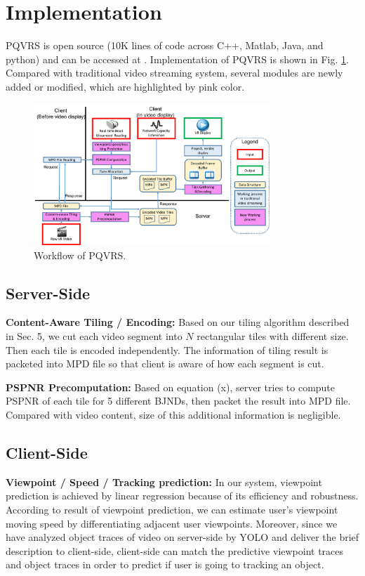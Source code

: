 \section{Implementation}

PQVRS is open source (10K lines of code across C++, Matlab, Java, and python) and can be accessed at \cite{github}. Implementation of PQVRS is shown in Fig. \ref{implementation}. Compared with traditional video streaming system, several modules are newly added or modified, which are highlighted by pink color.

\begin{figure}
  \centering
  \includegraphics[width=3.5in]{images/implementation.pdf}
  \caption{Workflow of PQVRS.}
  \label{implementation}
  \end{figure}

\subsection{Server-Side}

\textbf{Content-Aware Tiling / Encoding:} Based on our tiling algorithm described in Sec. 5, we cut each video segment into $N$ rectangular tiles with different size. Then each tile is encoded independently. The information of tiling result is packeted into MPD file so that client is aware of how each segment is cut. 

\textbf{PSPNR Precomputation:} Based on equation (x), server tries to compute PSPNR of each tile for 5 different BJNDs, then packet the result into MPD file. Compared with video content, size of this additional information is negligible.

\subsection{Client-Side}

\textbf{Viewpoint / Speed / Tracking prediction:} In our system, viewpoint prediction is achieved by linear regression because of its efficiency and robustness. According to result of viewpoint prediction, we can estimate user's viewpoint moving speed by differentiating adjacent user viewpoints. Moreover, since we have analyzed object traces of video on server-side by YOLO \cite{yolo} and deliver the brief description to client-side, client-side can match the predictive viewpoint traces and object traces in order to predict if user is going to tracking an object.

